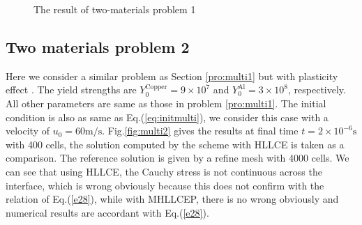\documentclass[review]{elsarticle}
\begin{document}
\begin{figure}
      \caption{ The result of two-materials  problem 1}
      \label{fig:multi1}
    \end{figure}

\subsection{Two materials problem 2}
Here we consider a similar problem as Section \ref{pro:multi1} but with plasticity effect . The yield strengths are $Y_0^{\text{Copper}} = 9\times 10^7$ and $Y_0^{\text{Al}} = 3\times 10^8$, respectively. All other  parameters are same as those in problem \ref{pro:multi1}. The initial condition is also as  same as  Eq.(\ref{eq:initmulti}), we consider this case with a velocity of $u_0 = 60 \text{m}/\text{s}$.
Fig.\ref{fig:multi2} gives the results at final time $ t= 2 \times 10^{-6} \text{s}$ with 400 cells, the solution computed by the scheme with HLLCE is taken as a comparison. The reference solution is given by a refine mesh with 4000 cells. We can see that using HLLCE, the Cauchy stress is not continuous across the interface, which is wrong obviously because this does not confirm with the relation of Eq.(\ref{e28}), while with MHLLCEP, there is no wrong obviously and numerical results are accordant with Eq.(\ref{e28}).
\end{document}
